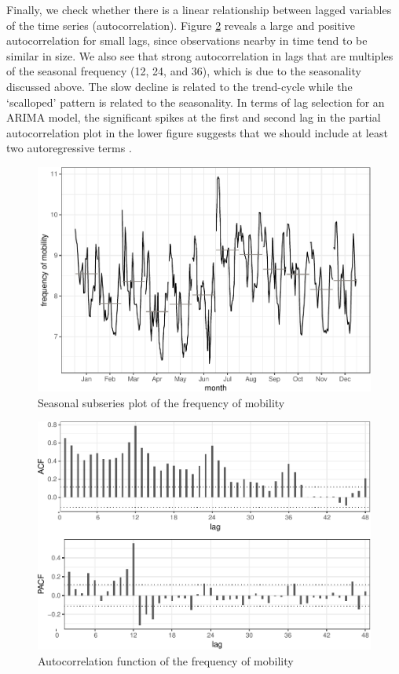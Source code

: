 \documentclass[12pt, a4paper]{article}
\begin{document}
Finally, we check whether there is a linear relationship between lagged
variables of the time series (autocorrelation). Figure
\ref{fig:autocorr-plot} reveals a large and positive autocorrelation for
small lags, since observations nearby in time tend to be similar in
size. We also see that strong autocorrelation in lags that are multiples
of the seasonal frequency (12, 24, and 36), which is due to the
seasonality discussed above. The slow decline is related to the
trend-cycle while the `scalloped' pattern is related to the seasonality.
In terms of lag selection for an ARIMA model, the significant spikes at
the first and second lag in the partial autocorrelation plot in the
lower figure suggests that we should include at least two autoregressive
terms \citep{hyndman2018forecasting}.

\begin{figure}[H]
  \caption{\label{fig:freq-month-plot}Seasonal subseries plot of the frequency
of mobility}
\centering
\includegraphics[scale = 0.8]{../figs/freq--freq-month-plot-1.pdf}
\end{figure}

\begin{figure}[H]
  \caption{\label{fig:autocorr-plot}Autocorrelation function of the frequency
of mobility}
\centering
\includegraphics[scale = 0.8]{../figs/freq--autocorr-plot-1.pdf}
\end{figure}
\end{document}
